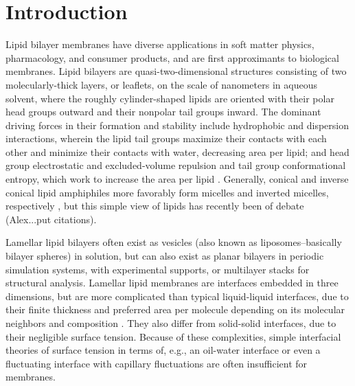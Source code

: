 \documentclass[9pt,bestpractices]{livecoms}
\begin{document}
\section{Introduction}
\label{sec:intro}
Lipid bilayer membranes have diverse applications in soft matter physics, pharmacology, and consumer products, and are first approximants to biological membranes.
Lipid bilayers are quasi-two-dimensional structures consisting of two molecularly-thick layers, or leaflets, on the scale of nanometers in aqueous solvent, where the roughly cylinder-shaped lipids are oriented with their polar head groups outward and their nonpolar tail groups inward.
The dominant driving forces in their formation and stability include hydrophobic and dispersion interactions, wherein the lipid tail groups maximize their contacts with each other and minimize their contacts with water, decreasing area per lipid; and head group electrostatic and excluded-volume repulsion and tail group conformational entropy, which work to increase the area per lipid \cite{Ben-Shaul1995}.
Generally, conical and inverse conical lipid amphiphiles more favorably form micelles and inverted micelles, respectively \cite{Israelachvili2011}, but this simple view of lipids has recently been of debate (Alex...put citations).

Lamellar lipid bilayers often exist as vesicles (also known as liposomes--basically bilayer spheres) in solution, but can also exist as planar bilayers in periodic simulation systems, with experimental supports, or multilayer stacks for structural analysis.
Lamellar lipid membranes are interfaces embedded in three dimensions, but are more complicated than typical liquid-liquid interfaces, due to their finite thickness and preferred area per molecule depending on its molecular neighbors and composition \cite{Diamant2011,Safran1994}.
They also differ from solid-solid interfaces, due to their negligible surface tension.
Because of these complexities, simple interfacial theories of surface tension in terms of, e.g., an oil-water interface or even a fluctuating interface with capillary fluctuations are often insufficient for membranes.
\end{document}
